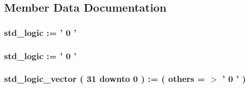 \subsection{\-Member \-Data \-Documentation}
\hypertarget{class_p_counte__tb_1_1behavior_aaf5ddd6f1a6925eba963bfefa161e9df}{
\subsubsection[{pc}]{ {\bfseries  } }}\label{class_p_counte__tb_1_1behavior_aaf5ddd6f1a6925eba963bfefa161e9df}
\hypertarget{class_p_counte__tb_1_1behavior_acb38257efabc3b2fa08d2a365cd7ff01}{
\subsubsection[{clk}]{ {\bfseries std\-\_\-logic  \-:= '  0  ' } }}\label{class_p_counte__tb_1_1behavior_acb38257efabc3b2fa08d2a365cd7ff01}
\hypertarget{class_p_counte__tb_1_1behavior_afedcb12b726c79840717ef89dbe704ed}{
\subsubsection[{reset}]{ {\bfseries std\-\_\-logic  \-:= '  0  ' } }}\label{class_p_counte__tb_1_1behavior_afedcb12b726c79840717ef89dbe704ed}
\hypertarget{class_p_counte__tb_1_1behavior_ac2dd31bad98644f37a6e62a770f5a5f7}{
\subsubsection[{\-P\-C\-\_\-in}]{ {\bfseries std\-\_\-logic\-\_\-vector (   31    downto    0  )  \-:= (  others  = $>$ '  0  '  ) } }}\label{class_p_counte__tb_1_1behavior_ac2dd31bad98644f37a6e62a770f5a5f7}
